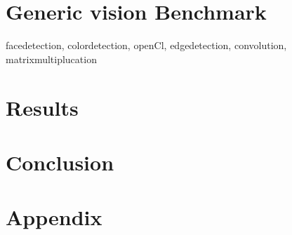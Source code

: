 \documentclass[english]{book_template} %
\begin{document}
\chapter{Generic vision Benchmark}
facedetection, colordetection, openCl, edgedetection, convolution, matrixmultiplucation

\chapter{Results}   


\chapter{Conclusion}

 
\printbibliography
\thispagestyle{plain}
\newpage
{}
\chapter{Appendix}
\appendix



\end{document}
